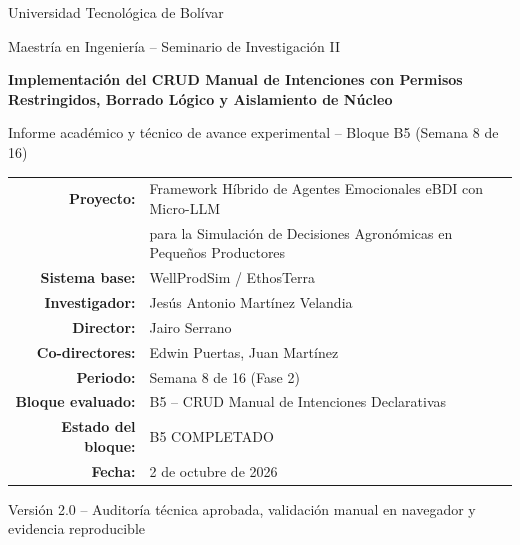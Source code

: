 \documentclass[11pt,a4paper]{article}
\begin{document}
\begin{titlepage}
    \centering
    \vspace*{1.2cm}

    {\large Universidad Tecnológica de Bolívar\par}
    \vspace{0.3cm}
    {\normalsize Maestría en Ingeniería -- Seminario de Investigación II\par}

    \vspace{2.0cm}
    {\LARGE\bfseries Implementación del CRUD Manual de Intenciones con Permisos Restringidos, Borrado Lógico y Aislamiento de Núcleo\par}
    \vspace{0.5cm}
    {\large Informe académico y técnico de avance experimental -- Bloque B5 (Semana 8 de 16)\par}

    \vspace{2.0cm}
    \begin{tabular}{rl}
        \textbf{Proyecto:} & Framework Híbrido de Agentes Emocionales eBDI con Micro-LLM \\
                           & para la Simulación de Decisiones Agronómicas en Pequeños Productores \\
        \textbf{Sistema base:} & WellProdSim / EthosTerra \\
        \textbf{Investigador:} & Jesús Antonio Martínez Velandia \\
        \textbf{Director:} & Jairo Serrano \\
        \textbf{Co-directores:} & Edwin Puertas, Juan Martínez \\
        \textbf{Periodo:} & Semana 8 de 16 (Fase 2) \\
        \textbf{Bloque evaluado:} & B5 -- CRUD Manual de Intenciones Declarativas \\
        \textbf{Estado del bloque:} & B5 COMPLETADO \\
        \textbf{Fecha:} & 2 de octubre de 2026 \\
    \end{tabular}

    \vfill
    {\small Versión 2.0 -- Auditoría técnica aprobada, validación manual en navegador y evidencia reproducible\par}
    \vspace*{0.8cm}
\end{titlepage}
\end{document}
